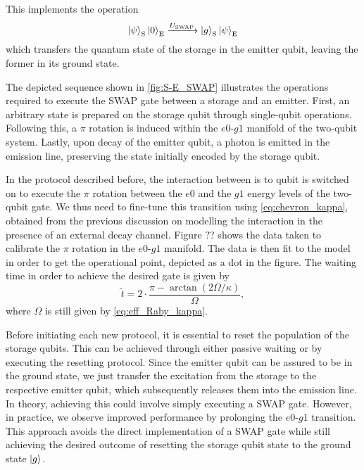 This implements the operation
\begin{equation}
    \ket{\psi}_{\text{S}} \ket{0}_{\text{E}} \xrightarrow{U_{\text{SWAP}}}
    \ket{g}_{\text{S}} \ket{\psi}_{\text{E}}
\end{equation}
which transfers the quantum state of the storage in the emitter qubit, leaving the former in its ground state.

The depicted sequence shown in \cref{fig:S-E_SWAP} illustrates the operations required to execute the SWAP gate between a storage and an emitter.
First, an arbitrary state is prepared on the storage qubit through single-qubit operations.
Following this, a $\pi$ rotation is induced within the $e0$-$g1$ manifold of the two-qubit system.
Lastly, upon decay of the emitter qubit, a photon is emitted in the emission line, preserving the state initially encoded by the storage qubit.

In the protocol described before, the interaction between is to qubit is switched on to execute the $\pi$ rotation between the $e0$ and the $g1$ energy levels of the two-qubit gate.
We thus need to fine-tune this transition using \cref{eq:chevron_kappa}, obtained from the previous discussion on modelling the interaction in the presence of an external decay channel.
Figure ?? shows the data taken to calibrate the $\pi$ rotation in the $e0$-$g1$ manifold.
The data is then fit to the model in order to get the operational point, depicted as a dot in the figure.
The waiting time in order to achieve the desired gate is given by
\begin{equation}
\label{eq:tilde_t_kappa}
    \widetilde{t} = 2 \cdot \frac{\pi - \arctan(2 \Omega / \kappa )}{\Omega} ,
\end{equation}
where $\Omega$ is still given by \cref{eq:eff_Raby_kappa}.

Before initiating each new protocol, it is essential to reset the population of the storage qubits.
This can be achieved through either passive waiting or by executing the resetting protocol.
Since the emitter qubit can be assured to be in the ground state, we just transfer the excitation from the storage to the respective emitter qubit, which subsequently releases them into the emission line.
In theory, achieving this could involve simply executing a SWAP gate.
However, in practice, we observe improved performance by prolonging the $e0$-$g1$ transition.
This approach avoids the direct implementation of a SWAP gate while still achieving the desired outcome of resetting the storage qubit state to the ground state $\ket{g}$.

